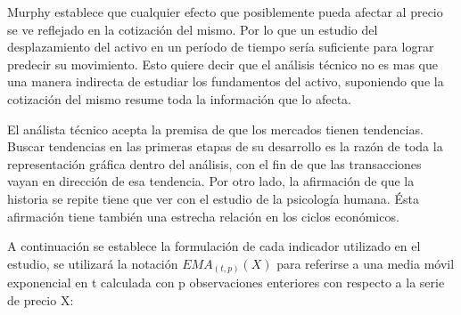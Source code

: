 \documentclass[a4paper,12pt]{Latex/Classes/PhDthesisPSnPDF}
\begin{document}
Murphy establece que cualquier efecto que posiblemente pueda afectar al precio se ve reflejado en la cotización del mismo. Por lo que un estudio del desplazamiento del activo en un período de tiempo sería suficiente para lograr predecir su movimiento. Esto quiere decir que el análisis técnico no es mas que una manera indirecta de estudiar los fundamentos del activo, suponiendo que la cotización del mismo resume toda la información que lo afecta. 

El análista técnico acepta la premisa de que los mercados tienen tendencias. Buscar tendencias en las primeras etapas de su desarrollo es la razón de toda la representación gráfica dentro del análisis, con el fin de que las transacciones vayan en dirección de esa tendencia. Por otro lado, la afirmación de que la historia se repite tiene que ver con el estudio de la psicología humana. Ésta afirmación tiene también una estrecha relación en los ciclos económicos. 

A continuación se establece la formulación de cada indicador utilizado en el estudio, se utilizará la notación $EMA_{(t, p)}(X)$ para referirse a una media móvil exponencial en t calculada con p observaciones enteriores con respecto a la serie de precio X:
\end{document}
